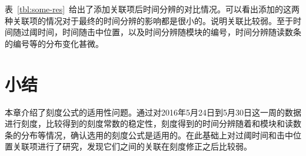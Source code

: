 表~\ref{tbl:some-res}~给出了添加关联项后时间分辨的对比情况。可以看出添加的这两种关联项的情况对于最终的时间分辨的影响都是很小的。说明关联比较弱。至于时间随过阈时间，时间随击中位置，以及时间分辨随模块的编号，时间分辨随读数条的编号等的分布变化甚微。

\section{小结}
本章介绍了刻度公式的适用性问题。通过对2016年5月24日到5月30日这一周的数据进行刻度，比较得到的刻度常数的稳定性，刻度得到的时间分辨随着和模块和读数条的分布等情况，确认选用的刻度公式是适用的。在此基础上对过阈时间和击中位置关联项进行了研究，发现它们之间的关联在刻度修正之后比较弱。








